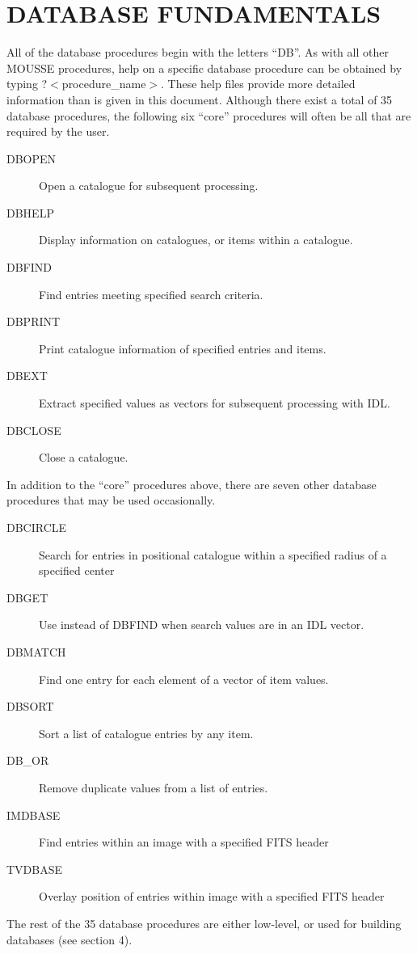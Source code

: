 \section{DATABASE FUNDAMENTALS}
All of the database procedures begin with the letters ``DB''.  
As with all other MOUSSE procedures,
help on a specific database procedure can be obtained by typing
?$<$procedure\_name$>$.  These help files provide more detailed information
than is given in this document.
Although there exist a total of 35 database procedures,
the following
six ``core'' procedures will often be all that are required by the user.
\begin{description}
\item[DBOPEN] Open a catalogue for subsequent processing.
\item[DBHELP] Display information on catalogues, or items within a catalogue.
\item[DBFIND] Find entries meeting specified search criteria.
\item[DBPRINT] Print catalogue information of specified entries and items.
\item[DBEXT] Extract specified values as vectors for subsequent processing
with IDL.
\item[DBCLOSE] Close a catalogue.
\end{description}
In addition to the ``core'' procedures above, there are seven other database 
procedures that may be used occasionally.
\begin{description}
\item[DBCIRCLE] Search for entries in positional catalogue within a specified 
              radius of a specified center
\item[DBGET] Use instead of DBFIND when search values are in an IDL vector.
\item[DBMATCH] Find one entry for each element of a vector of item values.
\item[DBSORT] Sort a list of catalogue entries by any item.
\item[DB\_OR] Remove duplicate values from a list of entries.
\item[IMDBASE] Find entries within an image with a specified FITS header
\item[TVDBASE] Overlay position of entries within image with a specified FITS
header
\end{description}
  
The rest of the 35 database procedures are either low-level, or used for
building databases (see section 4).

